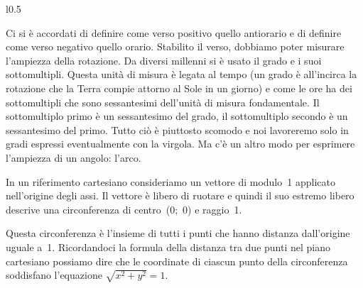 \begin{wrapfigure}{l}{0.5\textwidth} 
 \vspace{-6pt}
  \begin{minipage}{.3\textwidth}
  \begin{center}
\begin{inaccessibleblock}
    
\end{inaccessibleblock}
  \end{center}
  \end{minipage}
   \vspace{-12pt}
  \vspace{1pt}
\end{wrapfigure} 
 
Ci si è accordati di definire come verso positivo quello antiorario e di 
definire come verso negativo quello orario.
Stabilito il verso, dobbiamo poter misurare l'ampiezza della rotazione. 
Da diversi millenni si è usato il grado e i suoi sottomultipli. 
Questa unità di misura è legata al tempo (un grado è all'incirca la rotazione 
che la Terra compie attorno al Sole in un giorno) e come le ore ha dei 
sottomultipli che sono sessantesimi dell'unità di misura fondamentale. 
Il sottomultiplo primo è un sessantesimo del grado, il sottomultiplo secondo 
è un sessantesimo del primo. 
Tutto ciò è piuttosto scomodo e noi lavoreremo solo in gradi espressi 
eventualmente con la virgola. Ma c'è un altro modo per esprimere l'ampiezza 
di un angolo: l'arco. 

In un riferimento cartesiano consideriamo un vettore di modulo~1 applicato
nell'origine degli assi. 
Il vettore è libero di ruotare e quindi il suo estremo 
libero descrive una circonferenza di centro~(0;~0) e raggio~1. 

Questa circonferenza è l'insieme di tutti i punti che hanno distanza 
dall'origine uguale a~1. Ricordandoci la formula della distanza tra due punti
nel piano cartesiano possiamo dire che le coordinate di ciascun punto della 
circonferenza soddisfano l'equazione $\sqrt{x^2 + y^2} = 1$.

\providecommand*\wideparen[1]{
  \setbox254\hbox{$#1$}
  \dimen0=\wd254\relax
  \setbox254\hbox{\rotatebox{-90}{(}}
  \vbox{
    \ialign{
     ##\crcr
     \resizebox{\dimen0}{!}{\box254}\crcr
     $\hfil\displaystyle{#1}\hfil$\crcr
    }
  }
}

